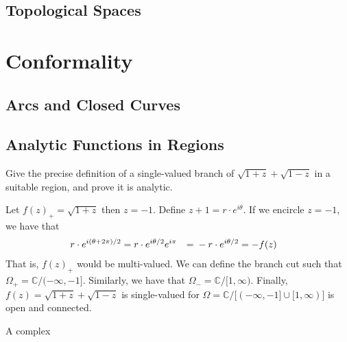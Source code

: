 \subsection{Topological Spaces}

\section{Conformality}

\subsection{Arcs and Closed Curves}

\subsection{Analytic Functions in Regions}

\begin{exercise}
	\item
		Give the precise definition of a single-valued branch of \(\sqrt{1 + z} + \sqrt{1 - z}\)
		in a suitable region, and prove it is analytic.
		\par\smallskip
		Let \(f(z)_+ = \sqrt{1 + z}\) then \(z = -1\).
		Define \(z + 1 = r\cdot e^{i\theta}\).
		If we encircle \(z = -1\), we have that
		\[
			\begin{aligned}
				r\cdot e^{i(\theta + 2\pi) / 2} &={} r\cdot e^{i\theta/2}e^{i\pi} &={} -r\cdot e^{i\theta/2} 
				&= -f(z) \notag
			\end{aligned}
		\]
		That is, \(f(z)_+\) would be multi-valued.
		We can define the branch cut such that \(\Omega_+ = \mathbb{C} / (-\infty, -1]\).
		Similarly, we have that \(\Omega_- = \mathbb{C} / [1, \infty)\).
		Finally, \(f(z) = \sqrt{1 + z} + \sqrt{1 - z}\) is single-valued for 
		\(\Omega = \mathbb{C} / \big[(-\infty, -1]\cup [1, \infty)\big]\) is open and connected.
		
		A complex
\end{exercise}

